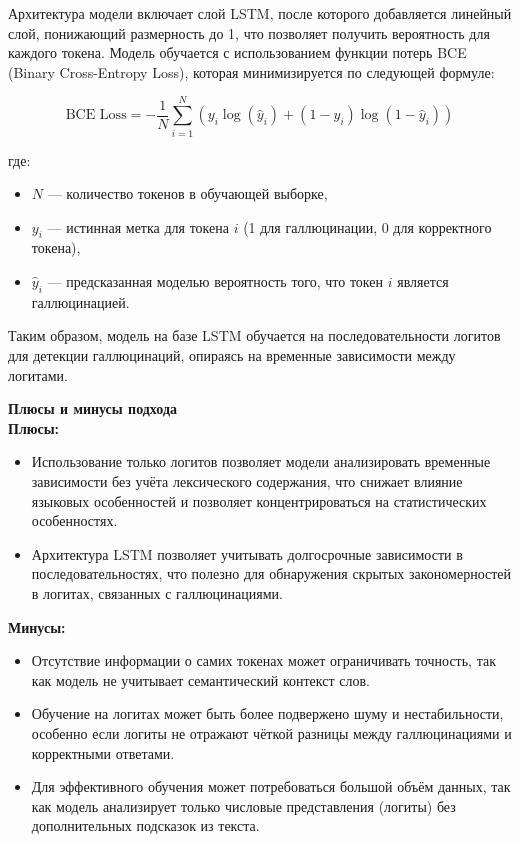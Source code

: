 \documentclass[12pt]{article}
\begin{document}
Архитектура модели включает слой LSTM, после которого добавляется линейный слой, понижающий размерность до 1, что позволяет получить вероятность для каждого токена. Модель обучается с использованием функции потерь BCE (Binary Cross-Entropy Loss), которая минимизируется по следующей формуле:

\[
\text{BCE Loss} = -\frac{1}{N} \sum_{i=1}^{N} \left( y_i \log(\hat{y}_i) + (1 - y_i) \log(1 - \hat{y}_i) \right)
\]

где:
\begin{itemize}
    \item \( N \) — количество токенов в обучающей выборке,
    \item \( y_i \) — истинная метка для токена \( i \) (1 для галлюцинации, 0 для корректного токена),
    \item \( \hat{y}_i \) — предсказанная моделью вероятность того, что токен \( i \) является галлюцинацией.
\end{itemize}

Таким образом, модель на базе LSTM обучается на последовательности логитов для детекции галлюцинаций, опираясь на временные зависимости между логитами.

\textbf{Плюсы и минусы подхода}\\
\textbf{Плюсы:}
    \begin{itemize}
        \item Использование только логитов позволяет модели анализировать временные зависимости без учёта лексического содержания, что снижает влияние языковых особенностей и позволяет концентрироваться на статистических особенностях.
        \item Архитектура LSTM позволяет учитывать долгосрочные зависимости в последовательностях, что полезно для обнаружения скрытых закономерностей в логитах, связанных с галлюцинациями.
    \end{itemize}
\textbf{Минусы:}
    \begin{itemize}
        \item Отсутствие информации о самих токенах может ограничивать точность, так как модель не учитывает семантический контекст слов.
        \item Обучение на логитах может быть более подвержено шуму и нестабильности, особенно если логиты не отражают чёткой разницы между галлюцинациями и корректными ответами.
        \item Для эффективного обучения может потребоваться большой объём данных, так как модель анализирует только числовые представления (логиты) без дополнительных подсказок из текста.
    \end{itemize}
\end{document}

